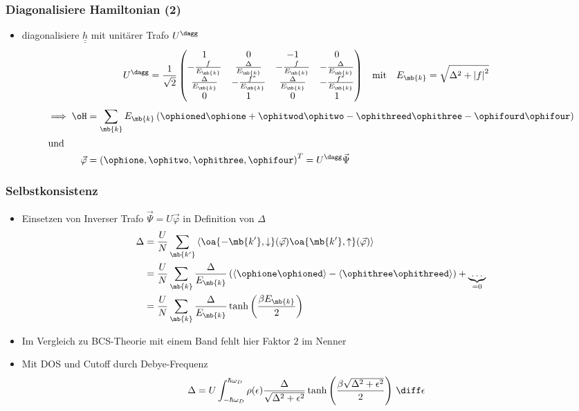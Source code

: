 \begin{frame}
	\frametitle{ Diagonalisiere Hamiltonian (2)}
    \begin{itemize}
        \item diagonalisiere $\underline{\underline{h}}$ mit unitärer Trafo $U^\dagg$
        \begin{align*}
            U^\dagg &= \frac{1}{\sqrt{2}}\begin{pmatrix}
                1 & 0 & -1 & 0 \\
                -\frac{f}{E_\mb{k}} & \frac{\Delta}{E_\mb{k}} & -\frac{f}{E_\mb{k}} & -\frac{\Delta}{E_\mb{k}} \\
                \frac{\Delta}{E_\mb{k}} & -\frac{f^*}{E_\mb{k}}  & \frac{\Delta}{E_\mb{k}} & -\frac{f^*}{E_\mb{k}} \\
                0 & 1 & 0 & 1
            \end{pmatrix} 
            & \text{mit} & &E_\mb{k} &= \sqrt{\Delta^2 + \abs{f}^2}
        \end{align*}
        \begin{align*}
            \implies \oH &= \sum_\mb{k} E_\mb{k} \left( \ophioned \ophione + \ophitwod \ophitwo - \ophithreed \ophithree - \ophifourd \ophifour  \right) \\
            \intertext{und} \vec{\varphi} &= \left(\ophione, \ophitwo, \ophithree, \ophifour\right)^T = U^\dagg \vec{\Psi}
        \end{align*}
    \end{itemize}
\end{frame}

\begin{frame}
	\frametitle{ Selbstkonsistenz }
    \begin{itemize}
        \item Einsetzen von Inverser Trafo $\vec{\Psi} = U \vec{\varphi}$ in Definition von $\Delta$ 
        \begin{align*}
            \Delta &= \frac{U}{N} \sum_{\mb{k'}} \expval{\oa{-\mb{k'}, \downarrow } (\vec{\varphi}) \oa{\mb{k'}, \uparrow}(\vec{\varphi}) } \\
            &= \frac{U}{N} \sum_{\mb{k}} \frac{\Delta}{E_\mb{k}} \left( \expval{\ophione \ophioned } - \expval{\ophithree \ophithreed}\right) + \underbrace{\dots}_{=0} \\
            &= \frac{U}{N} \sum_{\mb{k}} \frac{\Delta}{E_\mb{k}} \tanh \left(\frac{\beta E_\mb{k}}{2}\right)
        \end{align*}
        \item Im Vergleich zu BCS-Theorie mit einem Band fehlt hier Faktor $2$ im Nenner
        \item Mit DOS und Cutoff durch Debye-Frequenz 
        \begin{align*}
            \Delta &= U \int_{-\hbar \omega_D}^{\hbar \omega_D} \rho(\epsilon) \frac{\Delta}{\sqrt{\Delta^2 + \epsilon^2}} \tanh\left(\frac{\beta \sqrt{\Delta^2 + \epsilon^2}}{2}\right) \, \diff \epsilon
        \end{align*}
    \end{itemize}
\end{frame}

